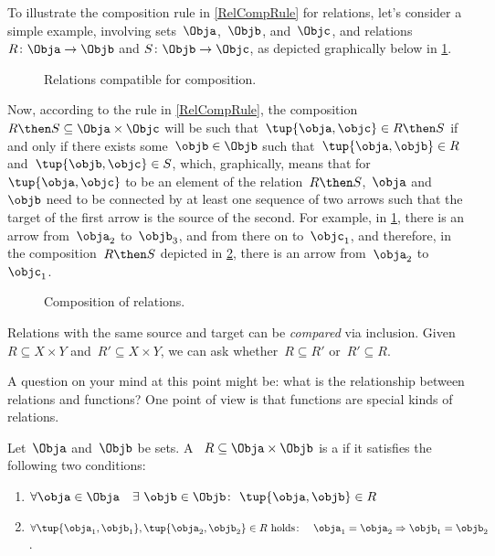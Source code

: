 To illustrate the composition rule in \cref{RelCompRule} for relations, let's consider a simple example, involving sets~$\Obja$,~$\Objb$, and~$\Objc$, and relations~$R \colon \Obja \to \Objb$ and $S \colon \Objb \to \Objc$, as depicted graphically below in \cref{fig:example_rel_composable}.
\begin{figure}[h!]
    \centering
    \caption{Relations compatible for composition.}
    \label{fig:example_rel_composable}
\end{figure}
Now, according to the rule in \cref{RelCompRule}, the composition~$R \then S \subseteq \Obja \times \Objc$ will be such that~$\tup{\obja,\objc} \in R \then S$ if and only if there exists some~$\objb \in \Objb$ such that~$\tup{\obja,\objb} \in R$ and~$\tup{\objb,\objc} \in S$, which, graphically, means that for~$\tup{\obja,\objc}$ to be an element of the relation~$R \then S$,~$\obja$ and~$\objb$ need to be connected by at least one sequence of two arrows such that the target of the first arrow is the source of the second. For example, in \cref{fig:example_rel_composable}, there is an arrow from~$\obja_2$ to~$\objb_3$, and from there on to~$\objc_1$, and therefore, in the composition~$R \then S$ depicted in \cref{fig:example_rel_composed}, there is an arrow from~$\obja_2$ to~$\objc_1$.
\begin{figure}[h!]
    \centering
    \caption{Composition of relations.}
    \label{fig:example_rel_composed}
\end{figure}

\begin{remark}
    Relations with the same source and target can be \emph{compared} via inclusion. Given~$R\subseteq X\times Y$ and~$R'\subseteq X\times Y$, we can ask whether~$R\subseteq R'$ or~$R'\subseteq R$.
\end{remark}
A question on your mind at this point might be: what is the relationship between relations and functions? One point of view is that functions are special kinds of relations.

\begin{definition}
    \label{def:functions_as_relations}
    Let~$\Obja$ and~$\Objb$ be sets. A ~$R \subseteq \Obja \times \Objb$ is a \textbf{} if it satisfies the following two conditions:
    \begin{enumerate}
        \item $\forall \obja \in \Obja \quad \exists \ \objb \in \Objb\colon  \ \tup{\obja,\objb} \in R$
        \item $\forall \tup{\obja_1, \objb_1}, \tup{\obja_2, \objb_2} \in R  \text{ holds}\colon \quad \obja_1 = \obja_2 \Rightarrow \objb_1 = \objb_2$.
    \end{enumerate}
\end{definition}

